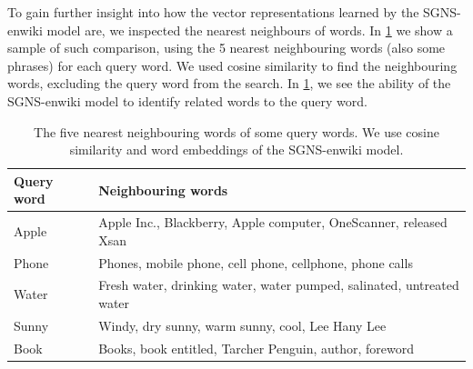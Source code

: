 To gain further insight into how the vector representations learned by the SGNS-enwiki model are, we inspected the nearest neighbours of words. In \cref{table:word2vec-nearest-neighbours-words} we show a sample of such comparison, using the 5 nearest neighbouring words (also some phrases) for each query word. We used cosine similarity to find the neighbouring words, excluding the query word from the search. In \cref{table:word2vec-nearest-neighbours-words}, we see the ability of the SGNS-enwiki model to identify related words to the query word.
\begin{table}[H]
    \centering
    \begin{tabular}{@{}ll@{}}
    \toprule
    Query word & Neighbouring words \\ \midrule
    \trcolor
    Apple        & Apple Inc., Blackberry, Apple computer, OneScanner, released Xsan \\
    Phone      & Phones, mobile phone, cell phone, cellphone, phone calls \\
    \trcolor
    Water   & Fresh water, drinking water, water pumped, salinated, untreated water \\
    Sunny      & Windy, dry sunny, warm sunny, cool, Lee Hany Lee \\
    \trcolor
    Book      & Books, book entitled, Tarcher Penguin, author, foreword \\ \bottomrule
    \end{tabular}
    \caption{The five nearest neighbouring words of some query words. We use cosine similarity and word embeddings of the SGNS-enwiki model.}
    \label{table:word2vec-nearest-neighbours-words}
\end{table}


